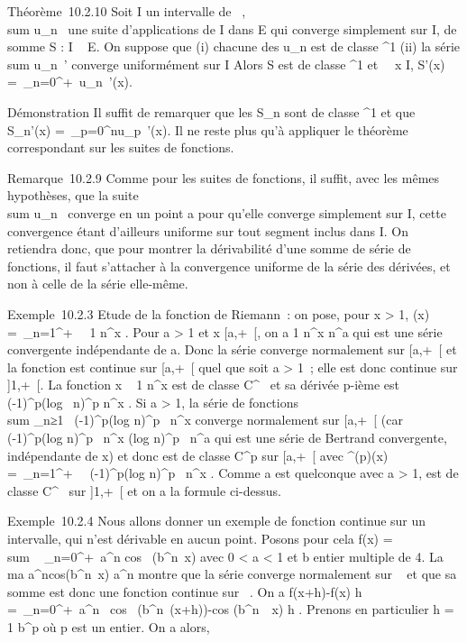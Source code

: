 \documentclass[]{article}
\begin{document}
Théorème~10.2.10 Soit I un intervalle de ~,
\\sum  u\_n~ une
suite d'applications de I dans E qui converge simplement sur I, de somme
S : I \rightarrow~ E. On suppose que (i) chacune des u\_n est de classe
^1 (ii) la série
\\sum  u\_n~'
converge uniformément sur I Alors S est de classe ^1 et
\forall~~x \in I, S'(x) =\
\sum  \_n=0^+\infty~u\_n~'(x).

Démonstration Il suffit de remarquer que les S\_n sont de classe
\mathcal{C}^1 et que S\_n'(x) =\
\sum  \_p=0^nu\_p~'(x). Il
ne reste plus qu'à appliquer le théorème correspondant sur les suites de
fonctions.

Remarque~10.2.9 Comme pour les suites de fonctions, il suffit, avec les
mêmes hypothèses, que la suite
\\sum  u\_n~
converge en un point a pour qu'elle converge simplement sur I, cette
convergence étant d'ailleurs uniforme sur tout segment inclus dans I. On
retiendra donc, que pour montrer la dérivabilité d'une somme de série de
fonctions, il faut s'attacher à la convergence uniforme de la série des
dérivées, et non à celle de la série elle-même.

Exemple~10.2.3 Etude de la fonction \zeta de Riemann~: on pose, pour x
\textgreater{} 1, \zeta(x) =\
\sum  \_n=1^+\infty~~ 1
\over n^x . Pour a \textgreater{} 1 et x \in
{[}a,+\infty~{[}, on a  1 \over n^x 
\over n^a qui est une série convergente
indépendante de a. Donc la série converge normalement sur {[}a,+\infty~{[} et
la fonction \zeta est continue sur {[}a,+\infty~{[} quel que soit a \textgreater{}
1~; elle est donc continue sur {]}1,+\infty~{[}. La fonction x \rightarrow~ 1
\over n^x est de classe C^\infty~ et sa
dérivée p-ième est  (-1)^p(log~
n)^p \over n^x . Si a
\textgreater{} 1, la série de fonctions
\\sum  \_n≥1~
(-1)^p(log n)^p~
\over n^x converge normalement sur
{[}a,+\infty~{[} (car \left \textbar{}
(-1)^p(log n)^p~
\over n^x \right
\textbar{}\leq (log n)^p~
\over n^a qui est une série de Bertrand
convergente, indépendante de x) et donc \zeta est de classe C^p
sur {[}a,+\infty~{[} avec \zeta^(p)(x) =\
\sum  \_n=1^+\infty~~
(-1)^p(log n)^p~
\over n^x . Comme a est quelconque avec a
\textgreater{} 1, \zeta est de classe C^\infty~ sur {]}1,+\infty~{[} et on a
la formule ci-dessus.

Exemple~10.2.4 Nous allons donner un exemple de fonction continue sur un
intervalle, qui n'est dérivable en aucun point. Posons pour cela f(x)
= \\sum ~
\_n=0^+\infty~a^n cos~
(b^n\pi~x) avec 0 \textless{} a \textless{} 1 et b entier
multiple de 4. La ma\jmathoration \left
\textbar{}a^ncos(b^n\pi~x)\right
\textbar{} \leq a^n montre que la série converge normalement sur
~ et que sa somme est donc une fonction continue sur \mathbb{R}~. On a 
f(x+h)-f(x) \over h =\
\sum  \_n=0^+\infty~a^n~
cos~
(b^n\pi~(x+h))-cos (b^n~\pi~x)
\over h . Prenons en particulier h = 1
\over b^p où p est un entier. On a alors,
\end{document}
